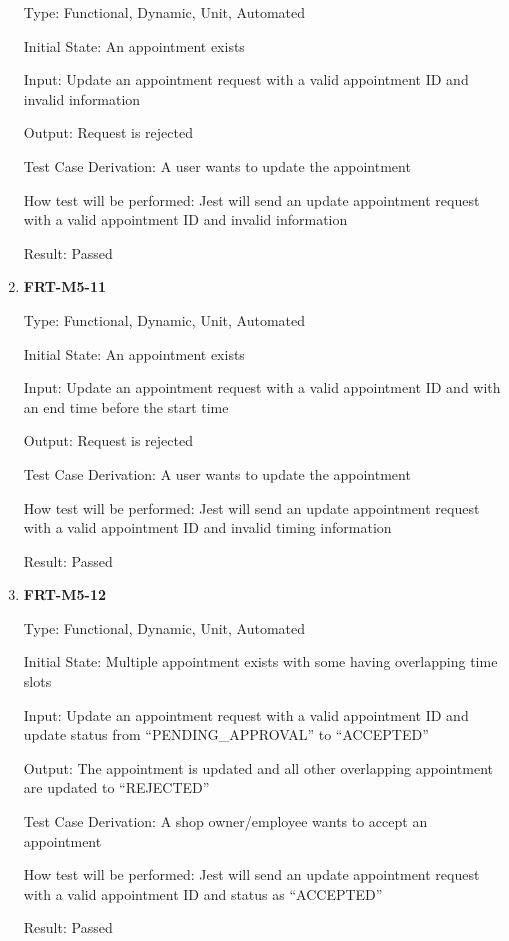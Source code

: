 \documentclass[12pt, titlepage]{article}
\begin{document}
\begin{enumerate}
	      Type: Functional, Dynamic, Unit, Automated

	      Initial State: An appointment exists

	      Input: Update an appointment request with a valid appointment ID and invalid information

	      Output: Request is rejected

	      Test Case Derivation: A user wants to update the appointment

	      How test will be performed: Jest will send an update appointment request with a valid appointment
	      ID and invalid information

	      Result: Passed

	\item \textbf{FRT-M5-11}

	      Type: Functional, Dynamic, Unit, Automated

	      Initial State: An appointment exists

	      Input: Update an appointment request with a valid appointment ID and with an end time before the
	      start time

	      Output: Request is rejected

	      Test Case Derivation: A user wants to update the appointment

	      How test will be performed: Jest will send an update appointment request with a valid appointment
	      ID and invalid timing information

	      Result: Passed

	\item \textbf{FRT-M5-12}

	      Type: Functional, Dynamic, Unit, Automated

	      Initial State: Multiple appointment exists with some having overlapping time slots

	      Input: Update an appointment request with a valid appointment ID and update status from
	      ``PENDING\_APPROVAL'' to ``ACCEPTED''

	      Output: The appointment is updated and all other overlapping appointment are updated to
	      ``REJECTED''

	      Test Case Derivation: A shop owner/employee wants to accept an appointment

	      How test will be performed: Jest will send an update appointment request with a valid appointment
	      ID and status as ``ACCEPTED''

	      Result: Passed


\end{enumerate}
\end{document}
